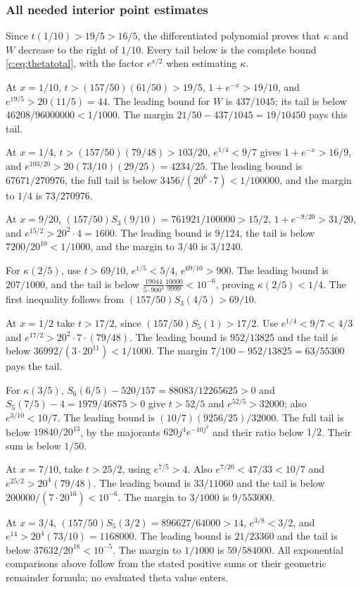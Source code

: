 \documentclass[11pt,a4paper]{article}
\numberwithin{equation}{section}
\theoremstyle{definition}\newtheorem{definition}[theorem]{Definition}
\theoremstyle{remark}\newtheorem{remark}[theorem]{Remark}
\begin{document}
\subsubsection{All needed interior point estimates}
Since $t(1/10)>19/5>16/5$, the differentiated polynomial proves that
$\kappa$ and $W$ decrease to the right of $1/10$.
Every tail below is the complete bound \eqref{c:eq:thetatotal}, with the factor $e^{x/2}$ when estimating $\kappa$.

At $x=1/10$,
$t>(157/50)(61/50)>19/5$,
$1+e^{-x}>19/10$, and $e^{19/5}>20(11/5)=44$.
The leading bound for $W$ is $437/1045$; its tail is below
$46208/96000000<1/1000$.
The margin $21/50-437/1045=19/10450$ pays this tail.

At $x=1/4$, $t>(157/50)(79/48)>103/20$,
$e^{1/4}<9/7$ gives $1+e^{-x}>16/9$, and
$e^{103/20}>20(73/10)(29/25)=4234/25$.
The leading bound is $67671/270976$, the full tail is below
$3456/(20^6\cdot7)<1/100000$, and the margin to $1/4$ is
$73/270976$.

At $x=9/20$,
$(157/50)S_3(9/10)=761921/100000>15/2$,
$1+e^{-9/20}>31/20$, and $e^{15/2}>20^2\cdot4=1600$.
The leading bound is $9/124$, the tail is below $7200/20^{10}<1/1000$,
and the margin to $3/40$ is $3/1240$.

For $\kappa(2/5)$, use $t>69/10$, $e^{1/5}<5/4$,
$e^{69/10}>900$.
The leading bound is $207/1000$, and the tail is below
$\frac{19044}{5\cdot900^4}\frac{10000}{9999}<10^{-6}$,
proving $\kappa(2/5)<1/4$.
The first inequality follows from $(157/50)S_3(4/5)>69/10$.

At $x=1/2$ take $t>17/2$, since $(157/50)S_5(1)>17/2$.
Use $e^{1/4}<9/7<4/3$ and $e^{17/2}>20^2\cdot7\cdot(79/48)$.
The leading bound is $952/13825$ and the tail is below
$36992/(3\cdot20^{11})<1/1000$.
The margin $7/100-952/13825=63/55300$ pays the tail.

For $\kappa(3/5)$,
$S_6(6/5)-520/157=88083/12265625>0$ and
$S_5(7/5)-4=1979/46875>0$ give $t>52/5$ and
$e^{52/5}>32000$; also $e^{3/10}<10/7$.
The leading bound is $(10/7)(9256/25)/32000$.
The full tail is below $19840/20^{13}$, by the majorants
$620j^4e^{-10j^2}$ and their ratio below $1/2$.
Their sum is below $1/50$.

At $x=7/10$, take $t>25/2$, using $e^{7/5}>4$.
Also $e^{7/20}<47/33<10/7$ and
$e^{25/2}>20^4(79/48)$.
The leading bound is $33/11060$ and the tail is below
$200000/(7\cdot20^{16})<10^{-6}$.
The margin to $3/1000$ is $9/553000$.

At $x=3/4$,
$(157/50)S_5(3/2)=896627/64000>14$,
$e^{3/8}<3/2$, and $e^{14}>20^4(73/10)=1168000$.
The leading bound is $21/23360$ and the tail is below
$37632/20^{18}<10^{-5}$.
The margin to $1/1000$ is $59/584000$.
All exponential comparisons above follow from the stated positive sums or their geometric remainder formula; no evaluated theta value enters.
\end{document}
